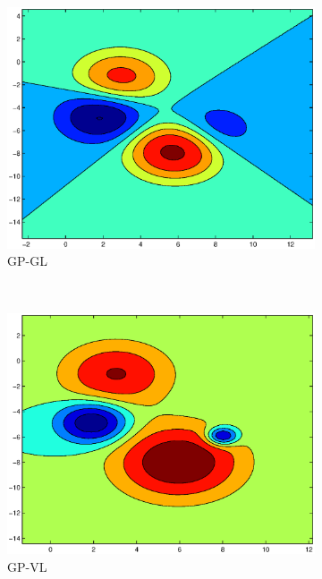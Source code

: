 \documentclass[useAMS,usenatbib,fleqn]{mn2e}
\begin{document}
\begin{figure}
         \begin{subfigure}[b]{0.3\columnwidth}
                \includegraphics[width=\textwidth]{figures/GL4.eps}
                \caption{GP-GL}
        \end{subfigure}
        ~
         \begin{subfigure}[b]{0.3\columnwidth}
                \includegraphics[width=\textwidth]{figures/VL4.eps}
                \caption{GP-VL}
        \end{subfigure}
        ~
        \begin{subfigure}[b]{0.3\columnwidth}

\end{subfigure}
\end{figure}
\end{document}
